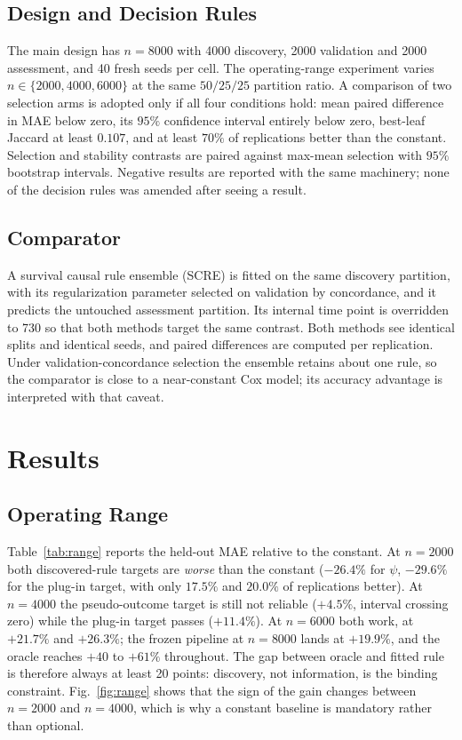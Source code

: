 \documentclass[conference]{IEEEtran}
\begin{document}
\subsection{Design and Decision Rules}

The main design has $n=8000$ with 4000 discovery, 2000 validation and 2000
assessment, and 40 fresh seeds per cell. The operating-range experiment varies
$n\in\{2000,4000,6000\}$ at the same $50/25/25$ partition ratio. A comparison
of two selection arms is adopted only if all four conditions hold: mean paired
difference in MAE below zero, its $95\%$ confidence interval entirely below
zero, best-leaf Jaccard at least $0.107$, and at least $70\%$ of replications
better than the constant. Selection and stability contrasts are paired against
max-mean selection with $95\%$ bootstrap intervals. Negative results are
reported with the same machinery; none of the decision rules was amended after
seeing a result.

\subsection{Comparator}

A survival causal rule ensemble (SCRE) \cite{scre} is fitted on the same
discovery partition, with its regularization parameter selected on validation
by concordance, and it predicts the untouched assessment partition. Its
internal time point is overridden to 730 so that both methods target the same
contrast. Both methods see identical splits and identical seeds, and paired
differences are computed per replication. Under validation-concordance
selection the ensemble retains about one rule, so the comparator is close to a
near-constant Cox model; its accuracy advantage is interpreted with that
caveat.

\section{Results}

\subsection{Operating Range}

Table~\ref{tab:range} reports the held-out MAE relative to the constant.
At $n=2000$ both discovered-rule targets are \emph{worse} than the constant
($-26.4\%$ for $\psi$, $-29.6\%$ for the plug-in target, with only $17.5\%$ and
$20.0\%$ of replications better). At $n=4000$ the pseudo-outcome target is
still not reliable ($+4.5\%$, interval crossing zero) while the plug-in target
passes ($+11.4\%$). At $n=6000$ both work, at $+21.7\%$ and $+26.3\%$; the
frozen pipeline at $n=8000$ lands at $+19.9\%$, and the oracle reaches
$+40$ to $+61\%$ throughout. The gap between oracle and fitted rule is
therefore always at least 20 points: discovery, not information, is the
binding constraint. Fig.~\ref{fig:range} shows that the sign of the gain
changes between $n=2000$ and $n=4000$, which is why a constant baseline is
mandatory rather than optional.
\end{document}
